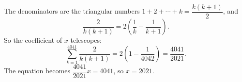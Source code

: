 The denominators are the triangular numbers $1+2+\cdots+k=\dfrac{k(k+1)}{2}$, and
\[\dfrac{2}{k(k+1)}=2\left(\dfrac1k-\dfrac{1}{k+1}\right).\]
So the coefficient of $x$ telescopes:
\[\sum_{k=1}^{4041}\dfrac{2}{k(k+1)}=2\left(1-\dfrac{1}{4042}\right)=\dfrac{4041}{2021}.\]
The equation becomes $\dfrac{4041}{2021}x=4041$, so $x=\boxed{2021}$.
